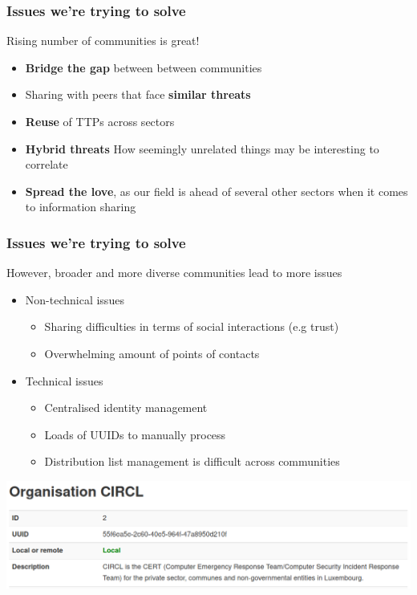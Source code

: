 \begin{frame}
\frametitle{Issues we're trying to solve}
    Rising number of communities is great!
    \begin{itemize}
        \item \textbf{Bridge the gap} between between communities
        \item Sharing with peers that face \textbf{similar threats}
        \item \textbf{Reuse} of TTPs across sectors
        \item \textbf{Hybrid threats} How seemingly unrelated things may be interesting to correlate
        \item \textbf{Spread the love}, as our field is ahead of several other sectors when it comes to information sharing
    \end{itemize}
\end{frame}

\begin{frame}
\frametitle{Issues we're trying to solve}
    However, broader and more diverse communities lead to more issues
    \begin{itemize}
        \item {Non-technical issues}
        \begin{itemize}
            \item Sharing difficulties in terms of social interactions (e.g trust)
            \item Overwhelming amount of points of contacts
        \end{itemize}
    \end{itemize}

    \begin{itemize}
        \item {Technical issues}
        \begin{itemize}
            \item Centralised identity management 
            \item Loads of UUIDs to manually process
            \item Distribution list management is difficult across communities
        \end{itemize}
    \end{itemize}
    \begin{center}
        \includegraphics[width=0.8\linewidth]{pictures/org-circl.png}
    \end{center}
\end{frame}

